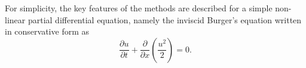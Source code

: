 For simplicity, the key features of the methods are described for
a simple non-linear partial differential equation, namely
the inviscid Burger's equation written in conservative form as
\begin{equation}
  \frac{\partial u}{\partial t} + 
  \frac{\partial}{\partial x} \left( \frac{u^2}{2} \right) = 
  0.
  \label{eq:sm_nonlinear_convection_conservative}
\end{equation}
